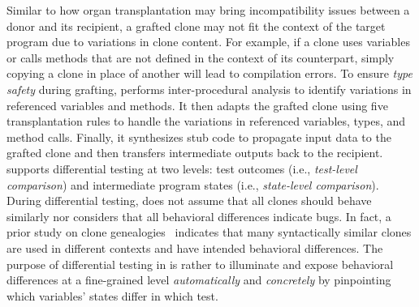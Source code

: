 Similar to how organ transplantation may bring incompatibility issues between a donor and its recipient, a grafted clone may not fit the context of the target program due to variations in clone content. For example, if a clone uses variables or calls methods that are not defined in the context of its counterpart, simply copying a clone in place of another will lead to compilation errors. To ensure {\em type safety} during grafting, {\grafter} performs inter-procedural analysis to identify variations in referenced variables and methods. It then adapts the grafted clone using five transplantation rules to handle the variations in referenced variables, types, and method calls. Finally, it synthesizes stub code to propagate input data to the grafted clone and then transfers intermediate outputs back to the recipient. {\grafter} supports differential testing at two levels: test outcomes (i.e., {\it test-level comparison}) and intermediate program states (i.e., {\it state-level comparison}). During differential testing, {\grafter} does not assume that all clones should behave similarly nor considers that all behavioral differences indicate bugs. In fact, a prior study on clone genealogies~\cite{Kim05} indicates that many syntactically similar clones are used in different contexts and have intended behavioral differences. The purpose of differential testing in {\grafter} is rather to illuminate and expose behavioral differences at a fine-grained level {\em automatically} and {\em concretely} by pinpointing which variables' states differ in which test.
 
